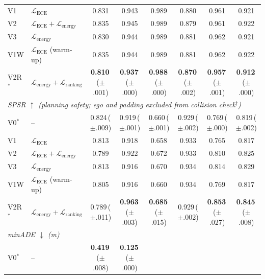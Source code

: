 \documentclass[journal,letterpaper]{IEEEtran}
\begin{document}
\begin{table}[t]
\begin{tabular}{l l c c c c c c}
V1   & $\mathcal{L}_\text{ECE}$
  & 0.831 & 0.943 & 0.989 & 0.880 & 0.961 & 0.921 \\
V2   & $\mathcal{L}_\text{ECE}{+}\mathcal{L}_\text{energy}$
  & 0.835 & 0.945 & 0.989 & 0.879 & 0.961 & 0.922 \\
V3   & $\mathcal{L}_\text{energy}$
  & 0.830 & 0.944 & 0.989 & 0.881 & 0.962 & 0.921 \\
V1W  & $\mathcal{L}_\text{ECE}$ (warm-up)
  & 0.835 & 0.944 & 0.989 & 0.881 & 0.962 & 0.922 \\
V2R$^*$ & $\mathcal{L}_\text{energy}{+}\mathcal{L}_\text{ranking}$
  & \textbf{0.810}\,\scriptsize{({\tiny$\pm$.001})}
  & \textbf{0.937}\,\scriptsize{({\tiny$\pm$.000})}
  & \textbf{0.988}\,\scriptsize{({\tiny$\pm$.000})}
  & \textbf{0.870}\,\scriptsize{({\tiny$\pm$.002})}
  & \textbf{0.957}\,\scriptsize{({\tiny$\pm$.001})}
  & \textbf{0.912}\,\scriptsize{({\tiny$\pm$.000})} \\
\midrule
\multicolumn{8}{l}{\textit{SPSR $\uparrow$ \quad
  (\emph{planning safety; ego and padding excluded from
   collision check$^\dagger$})}} \\[1pt]
V0$^*$  & --
  & 0.824\,\scriptsize{({\tiny$\pm$.009})}
  & 0.919\,\scriptsize{({\tiny$\pm$.001})}
  & 0.660\,\scriptsize{({\tiny$\pm$.001})}
  & 0.929\,\scriptsize{({\tiny$\pm$.002})}
  & 0.769\,\scriptsize{({\tiny$\pm$.000})}
  & 0.819\,\scriptsize{({\tiny$\pm$.002})} \\
V1   & $\mathcal{L}_\text{ECE}$
  & 0.813 & 0.918 & 0.658 & 0.933 & 0.765 & 0.817 \\
V2   & $\mathcal{L}_\text{ECE}{+}\mathcal{L}_\text{energy}$
  & 0.789 & 0.922 & 0.672 & 0.933 & 0.810 & 0.825 \\
V3   & $\mathcal{L}_\text{energy}$
  & 0.813 & 0.916 & 0.670 & 0.934 & 0.814 & 0.829 \\
V1W  & $\mathcal{L}_\text{ECE}$ (warm-up)
  & 0.805 & 0.916 & 0.660 & 0.934 & 0.769 & 0.817 \\
V2R$^*$ & $\mathcal{L}_\text{energy}{+}\mathcal{L}_\text{ranking}$
  & 0.789\,\scriptsize{({\tiny$\pm$.011})}
  & \textbf{0.963}\,\scriptsize{({\tiny$\pm$.003})}
  & \textbf{0.685}\,\scriptsize{({\tiny$\pm$.015})}
  & 0.929\,\scriptsize{({\tiny$\pm$.002})}
  & \textbf{0.853}\,\scriptsize{({\tiny$\pm$.027})}
  & \textbf{0.845}\,\scriptsize{({\tiny$\pm$.008})} \\
\midrule
\multicolumn{8}{l}{\textit{minADE $\downarrow$ (m)}} \\[1pt]
V0$^*$  & --
  & \textbf{0.419}\,\scriptsize{({\tiny$\pm$.008})}
  & \textbf{0.125}\,\scriptsize{({\tiny$\pm$.000})}

\end{tabular}
\end{table}
\end{document}
